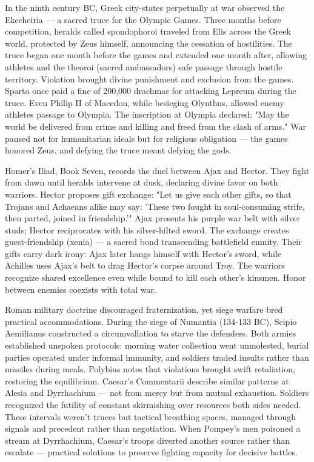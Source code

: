 In the ninth century BC, Greek city-states perpetually at war observed the Ekecheiria — a sacred truce for the Olympic Games. Three months before competition, heralds called spondophoroi traveled from Elis across the Greek world, protected by Zeus himself, announcing the cessation of hostilities. The truce began one month before the games and extended one month after, allowing athletes and the theoroi (sacred ambassadors) safe passage through hostile territory. Violation brought divine punishment and exclusion from the games. Sparta once paid a fine of 200,000 drachmas for attacking Lepreum during the truce. Even Philip II of Macedon, while besieging Olynthus, allowed enemy athletes passage to Olympia. The inscription at Olympia declared: "May the world be delivered from crime and killing and freed from the clash of arms." War paused not for humanitarian ideals but for religious obligation — the games honored Zeus, and defying the truce meant defying the gods.

Homer's Iliad, Book Seven, records the duel between Ajax and Hector. They fight from dawn until heralds intervene at dusk, declaring divine favor on both warriors. Hector proposes gift exchange: "Let us give each other gifts, so that Trojans and Achaeans alike may say: 'These two fought in soul-consuming strife, then parted, joined in friendship.'" Ajax presents his purple war belt with silver studs; Hector reciprocates with his silver-hilted sword. The exchange creates guest-friendship (xenia) — a sacred bond transcending battlefield enmity. Their gifts carry dark irony: Ajax later hangs himself with Hector's sword, while Achilles uses Ajax's belt to drag Hector's corpse around Troy. The warriors recognize shared excellence even while bound to kill each other's kinsmen. Honor between enemies coexists with total war.

Roman military doctrine discouraged fraternization, yet siege warfare bred practical accommodations. During the siege of Numantia (134-133 BC), Scipio Aemilianus constructed a circumvallation to starve the defenders. Both armies established unspoken protocols: morning water collection went unmolested, burial parties operated under informal immunity, and soldiers traded insults rather than missiles during meals. Polybius notes that violations brought swift retaliation, restoring the equilibrium. Caesar's Commentarii describe similar patterns at Alesia and Dyrrhachium — not from mercy but from mutual exhaustion. Soldiers recognized the futility of constant skirmishing over resources both sides needed. These intervals weren't truces but tactical breathing spaces, managed through signals and precedent rather than negotiation. When Pompey's men poisoned a stream at Dyrrhachium, Caesar's troops diverted another source rather than escalate — practical solutions to preserve fighting capacity for decisive battles.

